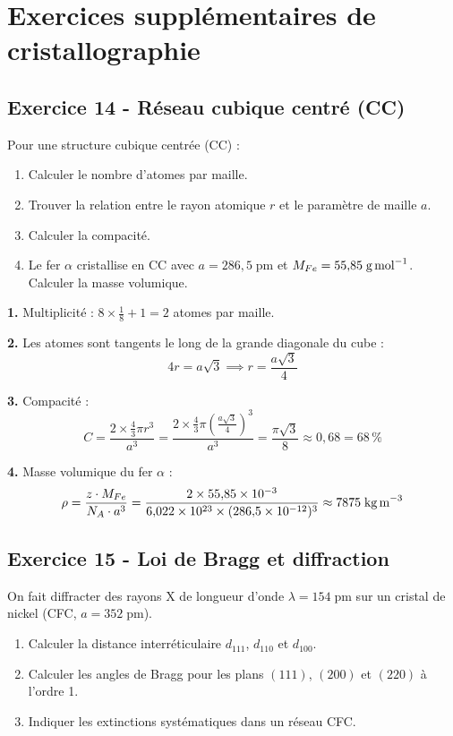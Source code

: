 \documentclass[12pt,a4paper]{article}
\begin{document}
\newpage
\section{Exercices supplémentaires de cristallographie}

\subsection*{Exercice 14 - Réseau cubique centré (CC) \niveau{\moyen}}

\begin{boiteexercice}
Pour une structure cubique centrée (CC) :
\begin{enumerate}
  \item Calculer le nombre d'atomes par maille.
  \item Trouver la relation entre le rayon atomique $r$ et le paramètre de maille $a$.
  \item Calculer la compacité.
  \item Le fer $\alpha$ cristallise en CC avec $a = 286{,}5\;\text{pm}$ et $M_{Fe} = 55{,}85\;\text{g\,mol}^{-1}$. Calculer la masse volumique.
\end{enumerate}
\end{boiteexercice}

\begin{boitecorrige}
\textbf{1.} Multiplicité : $8 \times \frac{1}{8} + 1 = 2$ atomes par maille.

\textbf{2.} Les atomes sont tangents le long de la grande diagonale du cube :
\[
4r = a\sqrt{3} \implies r = \frac{a\sqrt{3}}{4}
\]

\textbf{3.} Compacité :
\[
C = \frac{2 \times \frac{4}{3}\pi r^3}{a^3} = \frac{2 \times \frac{4}{3}\pi\left(\frac{a\sqrt{3}}{4}\right)^3}{a^3} = \frac{\pi\sqrt{3}}{8} \approx 0{,}68 = 68\,\%
\]

\textbf{4.} Masse volumique du fer $\alpha$ :
\[
\rho = \frac{z \cdot M_{Fe}}{N_A \cdot a^3} = \frac{2 \times 55{,}85 \times 10^{-3}}{6{,}022\times10^{23} \times (286{,}5\times10^{-12})^3} \approx 7875\;\text{kg\,m}^{-3}
\]
\end{boitecorrige}

\clearpage
\subsection*{Exercice 15 - Loi de Bragg et diffraction \niveau{\moyen}}

\begin{boiteexercice}
On fait diffracter des rayons X de longueur d'onde $\lambda = 154\;\text{pm}$ sur un cristal de nickel (CFC, $a = 352\;\text{pm}$).
\begin{enumerate}
  \item Calculer la distance interréticulaire $d_{111}$, $d_{110}$ et $d_{100}$.
  \item Calculer les angles de Bragg pour les plans $(111)$, $(200)$ et $(220)$ à l'ordre 1.
  \item Indiquer les extinctions systématiques dans un réseau CFC.
\end{enumerate}
\end{boiteexercice}
\end{document}

